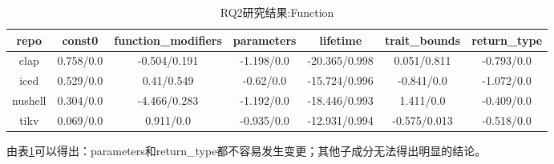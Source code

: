 \begin{table}[ht]
	\centering
	\caption{RQ2研究结果:Function}
	\begin{tabular}{ccccccc}
        \toprule
		\textbf{repo}    & \textbf{const0}    & \textbf{function\_modifiers} & \textbf{parameters} & \textbf{lifetime}      & \textbf{trait\_bounds} & \textbf{return\_type} \\
        \midrule
		clap    & \cellcolor{orange!30}0.758/0.0 & \cellcolor{gray!20}-0.504/0.191       & \cellcolor{orange!30}-1.198/0.0 & \cellcolor{gray!20}-20.365/0.998 & \cellcolor{gray!20}0.051/0.811  & \cellcolor{orange!30}-0.793/0.0  \\
		iced    & \cellcolor{orange!30}0.529/0.0 & \cellcolor{gray!20}0.41/0.549         & \cellcolor{orange!30}-0.62/0.0  & \cellcolor{gray!20}-15.724/0.996 & \cellcolor{orange!30}-0.841/0.0   & \cellcolor{orange!30}-1.072/0.0  \\
		nushell & \cellcolor{orange!30}0.304/0.0 & \cellcolor{gray!20}-4.466/0.283       & \cellcolor{orange!30}-1.192/0.0 & \cellcolor{gray!20}-18.446/0.993 & \cellcolor{green!20}1.411/0.0    & \cellcolor{orange!30}-0.409/0.0  \\
		tikv    & \cellcolor{orange!30}0.069/0.0 & \cellcolor{orange!30}0.911/0.0          & \cellcolor{orange!30}-0.935/0.0 & \cellcolor{gray!20}-12.931/0.994 & \cellcolor{orange!30}-0.575/0.013 & \cellcolor{orange!30}-0.518/0.0   \\
        \bottomrule 
	\end{tabular}
	\label{tab:RQ2-3}
\end{table}

由表\ref{tab:RQ2-3}可以得出：parameters和return\_type都不容易发生变更；其他子成分无法得出明显的结论。

